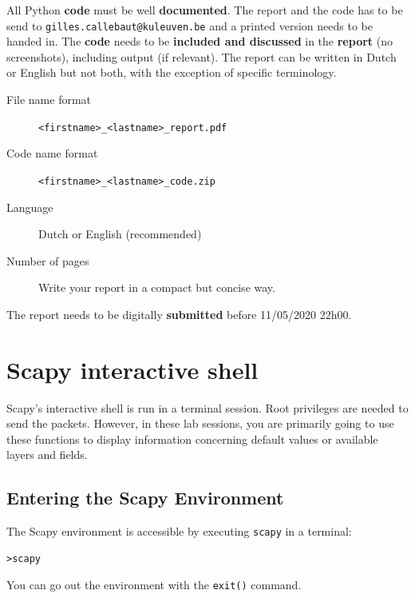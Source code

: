\documentclass[11pt,a4paper]{article}
\begin{document}
All Python \textbf{code} must be well \textbf{documented}.
The report and the code has to be send to \texttt{gilles.callebaut@kuleuven.be} and a printed version needs to be handed in. The \textbf{code} needs to be \textbf{included and discussed} in the \textbf{report} (no screenshots), including output (if relevant). The report can be written in Dutch or English but not both, with the exception of specific terminology. 

\begin{description}
	\item[File name format]  \texttt{<firstname>\_<lastname>\_report.pdf}
	\item[Code name format]  \texttt{<firstname>\_<lastname>\_code.zip}
	\item[Language] Dutch or English (recommended)
	\item[Number of pages] Write your report in a compact but concise way.
\end{description}


The report needs to be digitally \textbf{submitted} before 11/05/2020 22h00.%






\clearpage
\appendix
\section{Scapy interactive shell}\label{sec:scapy-interactive}

Scapy's interactive shell is run in a terminal session. Root privileges are needed to send the packets. However, in these lab sessions, you are primarily going to use these functions to display information concerning default values or available layers and fields.

\subsection{Entering the Scapy Environment}

The Scapy environment is accessible by executing \texttt{scapy} in a terminal:
%
\begin{lstlisting}
>scapy 
\end{lstlisting}
%
You can go out the environment with the \texttt{exit()} command.
\end{document}
